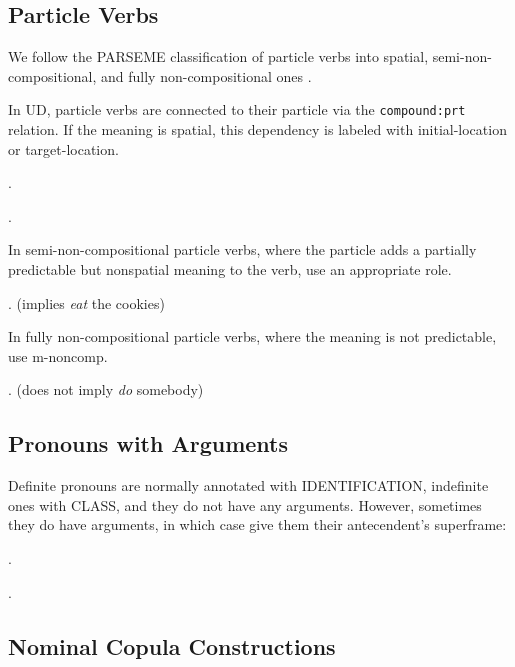 \documentclass[a4paper]{article}
\newcommand{\fr}[1]{\textsf{#1}}
\newcommand{\rl}[1]{\textsf{#1}}
\begin{document}
\newpage\subsection{Particle Verbs}

We follow the PARSEME classification of particle verbs into spatial,
semi-non-compositional, and fully non-compositional ones
\citep{savary-etal-2017-parseme,ramisch-etal-2018-edition,ramisch-etal-2020-edition,savary-etal-2023-parseme}.

In UD, particle verbs are connected to their particle via the
\texttt{compound:prt} relation. If the meaning is spatial, this dependency is
labeled with \rl{initial-location} or \rl{target-location}.

\ex.

\ex.

In semi-non-compositional particle verbs, where the particle adds a partially predictable
but nonspatial meaning to the verb, use an appropriate role.

\ex. (implies \emph{eat} the cookies)

In fully non-compositional particle verbs, where the meaning is not
predictable, use \rl{m-noncomp}.

\ex. (does not imply \emph{do} somebody)

\newpage\subsection{Pronouns with Arguments}

Definite pronouns are normally annotated with \fr{IDENTIFICATION}, indefinite
ones with \fr{CLASS}, and they do not have any arguments. However, sometimes
they do have arguments, in which case give them their antecendent's superframe:

\ex.

\ex.

\newpage\subsection{Nominal Copula Constructions}
\end{document}
